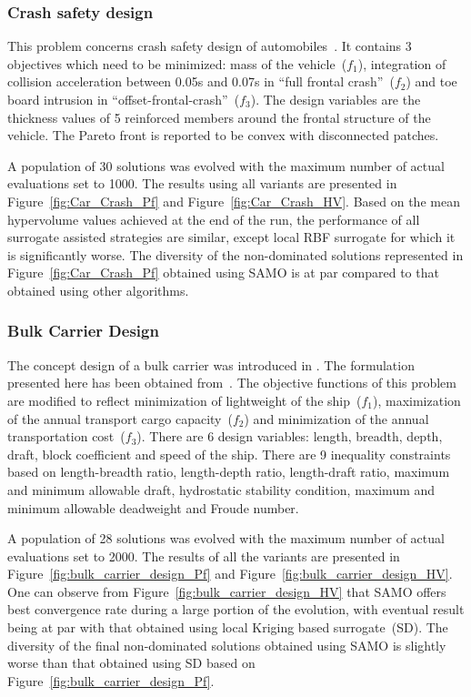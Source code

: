 \subsubsection{Crash safety design}
This problem concerns crash safety design of automobiles~\cite{Liao2008crash}. It contains 3 objectives which need to be minimized: mass of the vehicle~($f_1$), integration of collision acceleration between 0.05s and 0.07s in ``full frontal crash''~($f_2$) and toe board intrusion in ``offset-frontal-crash''~($f_3$). The design variables are the thickness values of 5 reinforced members around the frontal structure of the vehicle. The Pareto front is reported to be convex with disconnected patches.

A population of 30 solutions was evolved with the maximum number of actual evaluations set to 1000. The results using all variants are presented in Figure~\ref{fig:Car_Crash_Pf} and Figure~\ref{fig:Car_Crash_HV}. Based on the mean hypervolume values achieved at the end of the run, the performance of all surrogate assisted strategies are similar, except local RBF surrogate for which it is significantly worse. The diversity of the non-dominated solutions represented in Figure~\ref{fig:Car_Crash_Pf} obtained using SAMO is at par compared to that obtained using other algorithms.

\subsubsection{Bulk Carrier Design}
The concept design of a bulk carrier was introduced in \cite{sen1998mcd}. The formulation presented here has been obtained from~\cite{augusto2012new}. The objective functions of this problem are modified to reflect minimization of lightweight of the ship~($f_1$), maximization of the annual transport cargo capacity~($f_2$) and minimization of the annual transportation cost~($f_3$). There are 6 design variables: length, breadth, depth, draft, block coefficient and speed of the ship. There are 9 inequality constraints based on length-breadth ratio, length-depth ratio, length-draft ratio, maximum and minimum allowable draft, hydrostatic stability condition, maximum and minimum allowable deadweight and Froude number.

A population of 28 solutions was evolved with the maximum number of actual evaluations set to 2000. The results of all the variants are presented in Figure~\ref{fig:bulk_carrier_design_Pf} and Figure~\ref{fig:bulk_carrier_design_HV}. One can observe from Figure~\ref{fig:bulk_carrier_design_HV} that SAMO offers best convergence rate during a large portion of the evolution, with eventual result being at par with that obtained using local Kriging based surrogate~(SD). The diversity of the final non-dominated solutions obtained using SAMO is slightly worse than that obtained using SD based on Figure~\ref{fig:bulk_carrier_design_Pf}.


